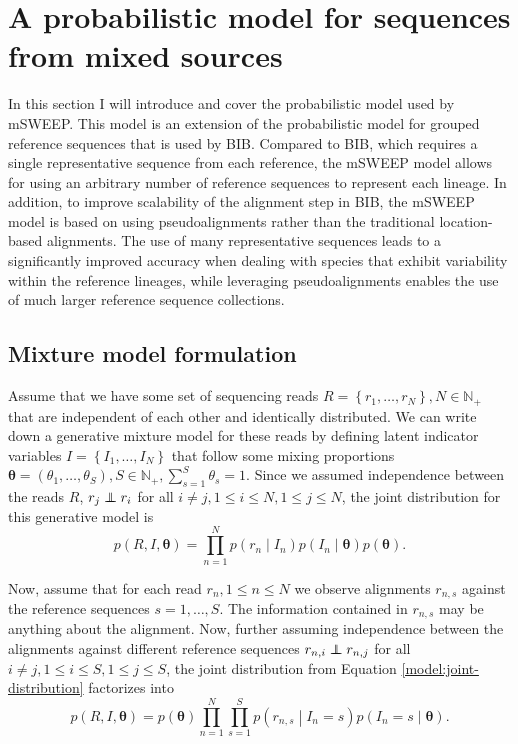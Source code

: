 \documentclass[officiallayout]{tktla}
\newcommand\indept{\protect\mathpalette{\protect\independenT}{\perp}}
\def\independenT#1#2{\mathrel{\rlap{$#1#2$}\mkern2mu{#1#2}}}
\begin{document}
\section{A probabilistic model for sequences from mixed sources}
\label{section:model}

In this section I will introduce and cover the probabilistic model
used by mSWEEP. This model is an extension of the probabilistic model
for grouped reference sequences that is used by BIB. Compared to BIB,
which requires a single representative sequence from each reference,
the mSWEEP model allows for using an arbitrary number of reference
sequences to represent each lineage. In addition, to improve
scalability of the alignment step in BIB, the mSWEEP model is based on
using pseudoalignments rather than the traditional location-based
alignments. The use of many representative sequences leads to a
significantly improved accuracy when dealing with species that exhibit
variability within the reference lineages, while leveraging
pseudoalignments enables the use of much larger reference sequence
collections.

\subsection{Mixture model formulation}

Assume that we have some set of sequencing reads $R = \left\{r_{1},
\dots, r_{N}\right\}, N \in \mathbb{N}_{+}$ that are independent of
each other and identically distributed. We can write down a generative
mixture model for these reads by defining latent indicator variables
$I = \left\{I_{1}, \dots, I_{N}\right\}$ that follow some mixing
proportions $\boldsymbol{\theta} = \left(\theta_{1}, \dots,
\theta_{S}\right), S \in \mathbb{N}_{+}, \sum_{s = 1}^{S} \theta_{s} =
1$. Since we assumed independence between the reads $R$, $r_{j}
\indept r_{i}$ for all $i \neq j, 1 \leq i \leq N, 1 \leq j \leq N$, the joint
distribution for this generative model is
\begin{equation}
  \label{model:joint-distribution}
  p\left(R, I, \boldsymbol\theta\right) = \prod_{n = 1}^{N}p\left(r_{n} \middle| I_{n}\right) p\left(I_{n} \middle| \boldsymbol\theta\right)p\left(\boldsymbol\theta\right).
\end{equation}

Now, assume that for each read $r_{n}, 1 \leq n \leq N$ we observe
alignments $r_{n, s}$ against the reference sequences $s = 1, \dots,
S$. The information contained in $r_{n, s}$ may be anything about the
alignment. Now, further assuming independence between the alignments
against different reference sequences $r_{n, i} \indept r_{n, j}$ for
all $i \neq j, 1 \leq i \leq S, 1 \leq j \leq S$, the joint
distribution from Equation \ref{model:joint-distribution} factorizes
into
\begin{equation}
  \label{model:joint-distribution-factorized}
  p\left(R, I, \boldsymbol\theta\right) = p\left(\boldsymbol\theta\right)\prod_{n = 1}^{N} \prod_{s = 1}^{S} p\left(r_{n, s} \middle| I_{n} = s\right) p\left(I_{n} = s \middle| \boldsymbol\theta\right).
\end{equation}
\end{document}
